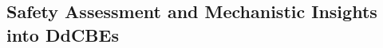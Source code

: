 \documentclass[12pt]{article}
\begin{document}
\subsection*{Safety Assessment and Mechanistic Insights into DdCBEs}


\end{document}
